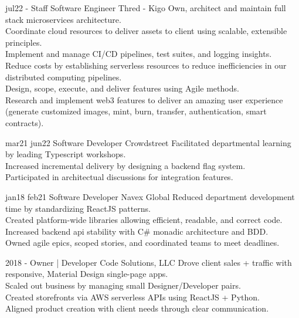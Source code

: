 \documentclass[]{friggeri-cv}
\begin{document}
\begin{entrylist}
  \entry
    {jul22 -}
    {Staff Software Engineer}
    {Thred - Kigo}
    {
      Own, architect and maintain full stack microservices architecture. \\
      Coordinate cloud resources to deliver assets to client using scalable, extensible principles. \\
      Implement and manage CI/CD pipelines, test suites, and logging insights. \\
      Reduce costs by establishing serverless resources to reduce inefficiencies in our distributed computing pipelines. \\
      Design, scope, execute, and deliver features using Agile methods. \\
      Research and implement web3 features to deliver an amazing user experience (generate customized images, mint, burn, transfer, authentication, smart contracts). 
    }


  \entry 
    {mar21 jun22}
    {Software Developer}
    {Crowdstreet}
    {
    Facilitated departmental learning by leading Typescript workshops.\\
    Increased incremental delivery by designing a backend flag system. \\
    Participated in architectual discussions for integration features.
    }
  

  \entry 
    {jan18 feb21}
    {Software Developer}
    {Navex Global}
    {
    Reduced department development time by standardizing ReactJS patterns.\\
    Created platform-wide libraries allowing efficient, readable, and correct code.\\
    Increased backend api stability with C\# monadic architecture and BDD.\\
    Owned agile epics, scoped stories, and coordinated teams to meet deadlines.
    }
  
  \entry 
    {2018 - }
    {Owner | Developer}
    {Code Solutions, LLC}
    {
    Drove client sales + traffic with responsive, Material Design single-page apps. \\
    Scaled out business by managing small Designer/Developer pairs.\\
    Created storefronts via AWS serverless APIs using ReactJS + Python. \\
    Aligned product creation with client needs through clear communication.}

\end{entrylist}
\end{document}
